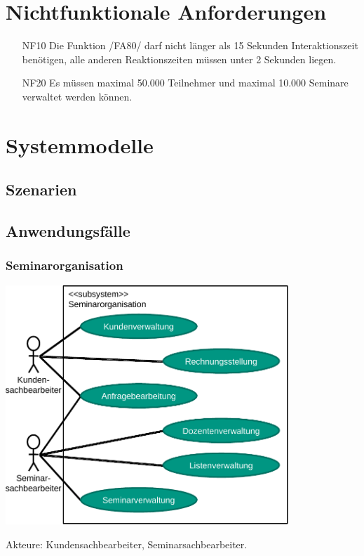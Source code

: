 \documentclass[parskip=full]{scrartcl}
\begin{document}
\section{Nichtfunktionale Anforderungen}
\begin{itemize}[nosep]
\item[NF10] Die Funktion /FA80/ darf nicht länger als 15 Sekunden Interaktionszeit benötigen, alle anderen Reaktionszeiten müssen unter 2 Sekunden liegen.
\item[NF20] Es müssen maximal 50.000 Teilnehmer und maximal 10.000 Seminare verwaltet werden können.
\end{itemize}

\section{Systemmodelle}

\subsection{Szenarien}

\subsection{Anwendungsfälle}
\subsubsection{Seminarorganisation}
\begin{center}
\includegraphics[width=0.8\textwidth]{szenario_seminarorganisation.pdf}
\end{center}

Akteure: Kundensachbearbeiter, Seminarsachbearbeiter.
\end{document}
